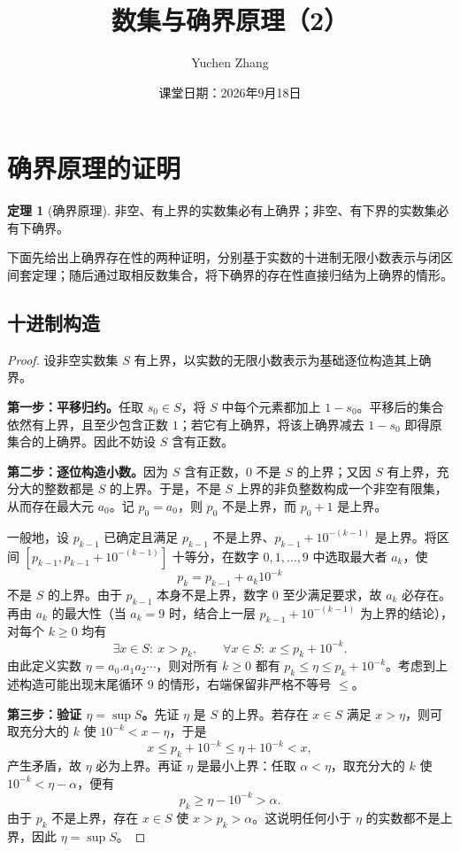 \documentclass[UTF8, fontset=fandol, a4paper, 12pt]{ctexart}
\title{数集与确界原理（2）}
\author{Yuchen Zhang}
\date{课堂日期：2026年9月18日}
\makeatletter
\theoremstyle{definition}
\newtheorem{theorem}[definition]{定理}
\renewcommand{\maketitle}{%
  \begin{center}
    {\LARGE\bfseries \@title\par}\vspace{0.6em}
    \@author\par\vspace{0.2em}
    {\small \@date\par}
  \end{center}
}
\makeatother
\begin{document}
\maketitle

\section{确界原理的证明}
\begin{theorem}[确界原理]
非空、有上界的实数集必有上确界；非空、有下界的实数集必有下确界。
\end{theorem}

下面先给出上确界存在性的两种证明，分别基于实数的十进制无限小数表示与闭区间套定理；随后通过取相反数集合，将下确界的存在性直接归结为上确界的情形。

\subsection{十进制构造}
\begin{proof}
设非空实数集 $S$ 有上界，以实数的无限小数表示为基础逐位构造其上确界。

\textbf{第一步：平移归约。}任取 $s_0\in S$，将 $S$ 中每个元素都加上 $1-s_0$。平移后的集合依然有上界，且至少包含正数 $1$；若它有上确界，将该上确界减去 $1-s_0$ 即得原集合的上确界。因此不妨设 $S$ 含有正数。

\medskip
\textbf{第二步：逐位构造小数。}因为 $S$ 含有正数，$0$ 不是 $S$ 的上界；又因 $S$ 有上界，充分大的整数都是 $S$ 的上界。于是，不是 $S$ 上界的非负整数构成一个非空有限集，从而存在最大元 $a_0$。记 $p_0=a_0$，则 $p_0$ 不是上界，而 $p_0+1$ 是上界。

一般地，设 $p_{k-1}$ 已确定且满足 $p_{k-1}$ 不是上界、$p_{k-1}+10^{-(k-1)}$ 是上界。将区间 $[p_{k-1},p_{k-1}+10^{-(k-1)}]$ 十等分，在数字 $0,1,\ldots,9$ 中选取最大者 $a_k$，使
\[
  p_k=p_{k-1}+a_k 10^{-k}
\]
不是 $S$ 的上界。由于 $p_{k-1}$ 本身不是上界，数字 $0$ 至少满足要求，故 $a_k$ 必存在。再由 $a_k$ 的最大性（当 $a_k=9$ 时，结合上一层 $p_{k-1}+10^{-(k-1)}$ 为上界的结论），对每个 $k\ge0$ 均有
\[
  \exists x\in S:\ x>p_k,
  \qquad \forall x\in S:\ x\le p_k+10^{-k}.
\]
由此定义实数 $\eta=a_0.a_1a_2\cdots$，则对所有 $k\ge0$ 都有 $p_k\le\eta\le p_k+10^{-k}$。考虑到上述构造可能出现末尾循环 $9$ 的情形，右端保留非严格不等号 $\le$。

\medskip
\textbf{第三步：验证 $\eta=\sup S$。}先证 $\eta$ 是 $S$ 的上界。若存在 $x\in S$ 满足 $x>\eta$，则可取充分大的 $k$ 使 $10^{-k}<x-\eta$，于是
\[
  x\le p_k+10^{-k}\le\eta+10^{-k}<x,
\]
产生矛盾，故 $\eta$ 必为上界。再证 $\eta$ 是最小上界：任取 $\alpha<\eta$，取充分大的 $k$ 使 $10^{-k}<\eta-\alpha$，便有
\[
  p_k\ge\eta-10^{-k}>\alpha.
\]
由于 $p_k$ 不是上界，存在 $x\in S$ 使 $x>p_k>\alpha$。这说明任何小于 $\eta$ 的实数都不是上界，因此 $\eta=\sup S$。
\end{proof}
\end{document}
